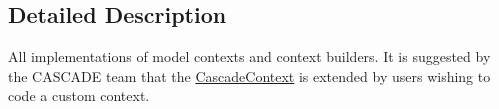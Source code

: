 \subsection{Detailed Description}
All implementations of model contexts and context builders. It is suggested by the C\-A\-S\-C\-A\-D\-E team that the \hyperlink{classuk_1_1ac_1_1dmu_1_1iesd_1_1cascade_1_1context_1_1_cascade_context}{Cascade\-Context} is extended by users wishing to code a custom context. 